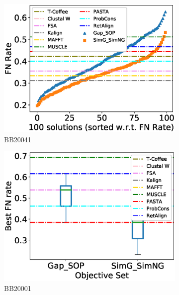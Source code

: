 \begin{figure}[!htbp]
\begin{adjustwidth}{-1.5cm}{-1cm}
\begin{subfigure}{0.22\textwidth}
			\includegraphics[width=\columnwidth]{Figure/summary/precomputedInit/Balibase/BB20041_fnrate_density_single_run}
			\caption{BB20041}
		\end{subfigure}
		\begin{subfigure}{0.22\textwidth}
			\includegraphics[width=\columnwidth]{Figure/summary/precomputedInit/Balibase/BB20001_objset_fnrate_rank}
			\caption{BB20001}
		\end{subfigure}	
		\begin{subfigure}{0.22\textwidth}

\end{subfigure}
\end{adjustwidth}
\end{figure}
